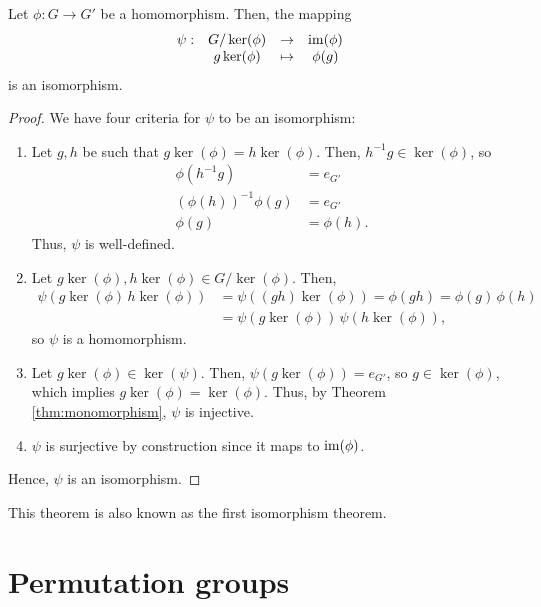 \begin{thm}
Let $ \phi:G\to G' $ be a homomorphism. Then, the mapping
\begin{equation*}
    \begin{array}{rccc}
        \psi: & G/\ker(\phi) & \to & \operatorname{im}(\phi) \\
        & g\ker(\phi) & \mapsto & \phi(g)
    \end{array}
\end{equation*}
is an isomorphism.
\end{thm}
\begin{proof}
We have four criteria for $ \psi $ to be an isomorphism:
\begin{enumerate}
    \item Let $ g,h $ be such that $ g\ker(\phi)=h\ker(\phi) $. Then, $ h^{-1}g\in\ker(\phi) $, so
    \begin{align*}
        \phi(h^{-1}g) &= e_{G'} \\
        (\phi(h))^{-1}\phi(g) &= e_{G'} \\
        \phi(g) &= \phi(h).
    \end{align*}
    Thus, $ \psi $ is well-defined.

    \item Let $ g\ker(\phi),h\ker(\phi)\in G/\ker(\phi) $. Then,
    \begin{align*}
        \psi(g\ker(\phi)\,h\ker(\phi)) &= \psi((gh)\ker(\phi))=\phi(gh)=\phi(g)\,\phi(h) \\
        &= \psi(g\ker(\phi))\,\psi(h\ker(\phi)),
    \end{align*}
    so $ \psi $ is a homomorphism.

    \item Let $ g\ker(\phi)\in\ker(\psi) $. Then, $ \psi(g\ker(\phi))=e_{G'} $, so $ g\in\ker(\phi) $, which implies $ g\ker(\phi)=\ker(\phi) $. Thus, by Theorem \ref{thm:monomorphism}, $ \psi $ is injective.

    \item $ \psi $ is surjective by construction since it maps to $ \operatorname{im}(\phi) $.
\end{enumerate}
Hence, $ \psi $ is an isomorphism.
\end{proof}

This theorem is also known as the first isomorphism theorem.

\section{Permutation groups}

